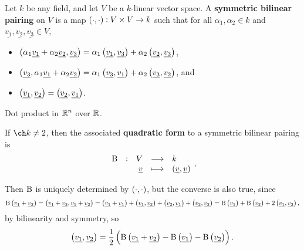 \begin{definition}
Let $ k $ be any field, and let $ V $ be a $ k $-linear vector space. A \textbf{symmetric bilinear pairing} on $ V $ is a map $ \br{\cdot, \cdot} : V \times V \to k $ such that for all $ \alpha_1, \alpha_2 \in k $ and $ \underline{v_1}, \underline{v_2}, \underline{v_3} \in V $,
\begin{itemize}
\item $ \br{\alpha_1\underline{v_1} + \alpha_2\underline{v_2}, \underline{v_3}} = \alpha_1\br{\underline{v_1}, \underline{v_3}} + \alpha_2\br{\underline{v_2}, \underline{v_3}} $,
\item $ \br{\underline{v_3}, \alpha_1\underline{v_1} + \alpha_2\underline{v_2}} = \alpha_1\br{\underline{v_3}, \underline{v_1}} + \alpha_2\br{\underline{v_3}, \underline{v_2}} $, and
\item $ \br{\underline{v_1}, \underline{v_2}} = \br{\underline{v_2}, \underline{v_1}} $.
\end{itemize}
\end{definition}

\begin{example}
Dot product in $ \mathbb{R}^n $ over $ \mathbb{R} $.
\end{example}

\begin{definition}
If $ \ch k \ne 2 $, then the associated \textbf{quadratic form} to a symmetric bilinear pairing is
$$ \function[\B]{V}{k}{\underline{v}}{\br{\underline{v}, \underline{v}}}. $$
\end{definition}

\begin{remark}
Then $ \mathrm{B} $ is uniquely determined by $ \br{\cdot, \cdot} $, but the converse is also true, since
$$ \B\br{\underline{v_1} + \underline{v_2}} = \br{\underline{v_1} + \underline{v_2}, \underline{v_1} + \underline{v_2}} = \br{\underline{v_1} + \underline{v_1}} + \br{\underline{v_1}, \underline{v_2}} + \br{\underline{v_2}, \underline{v_1}} + \br{\underline{v_2}, \underline{v_2}} = \B\br{\underline{v_1}} + \B\br{\underline{v_2}} + 2\br{\underline{v_1}, \underline{v_2}}, $$
by bilinearity and symmetry, so
$$ \br{\underline{v_1}, \underline{v_2}} = \dfrac{1}{2}\br{\B\br{\underline{v_1} + \underline{v_2}} - \B\br{\underline{v_1}} - \B\br{\underline{v_2}}}. $$
\end{remark}

